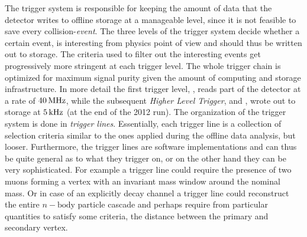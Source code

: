 
The trigger system is responsible for keeping the amount of data that the detector writes to offline storage
at a manageable level, since it is not feasible to save every collision-{\it event}. The three levels of
the \lhcb trigger system decide whether a certain event, is interesting from physics point
of view and should thus be written out to storage. The criteria used to filter out the interesting events 
get progressively more stringent at each trigger level. The whole trigger chain is optimized for maximum
signal purity given the amount of computing and storage infrastructure. In more detail the first trigger
level, \lzero, reads part of the detector at a rate of $40{\rm \,MHz}$, while the subsequent {\it Higher Level Trigger},
\hltone and \hlttwo, wrote out to storage at $5{\rm \,kHz}$ (at the end of the 2012 run). The organization of the trigger 
system is done in {\it trigger lines}. Essentially, each trigger line is a collection of selection criteria similar 
to the ones applied during the offline data analysis, but looser. Furthermore, the trigger lines are software
implementations and can thus be quite general as to what they trigger on, or on the other hand they can
be very sophisticated. For example a trigger line could require the presence of two muons forming a vertex 
with an invariant mass window around the nominal \jpsi mass. Or in case of an explicitly decay channel a 
trigger line could reconstruct the entire $n-\text{body}$ particle cascade and perhaps require from 
particular quantities to satisfy some criteria, \ie the distance between the primary and secondary vertex.   

